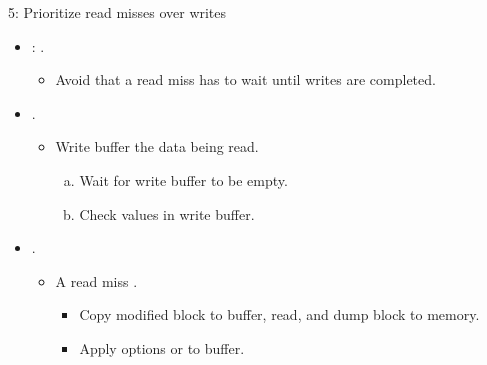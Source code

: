 \begin{frame}[t]{5: Prioritize read misses over writes}
\begin{itemize}
  \item {}: .
    \begin{itemize}
      \item Avoid that a read miss has to wait until writes are completed.
    \end{itemize}

  \item {}.
    \begin{itemize}
      \item Write buffer  the 
            data being read.
        \begin{enumerate}[a)]
          \item Wait for write buffer to be empty.
          \item Check values in write buffer.
        \end{enumerate}
    \end{itemize}

  \item {}.
    \begin{itemize}
      \item A read miss .
        \begin{itemize}
          \item Copy modified block to buffer, read, and dump block to memory.
          \item Apply options  or  to buffer.
        \end{itemize}
    \end{itemize}
\end{itemize}
\end{frame}

